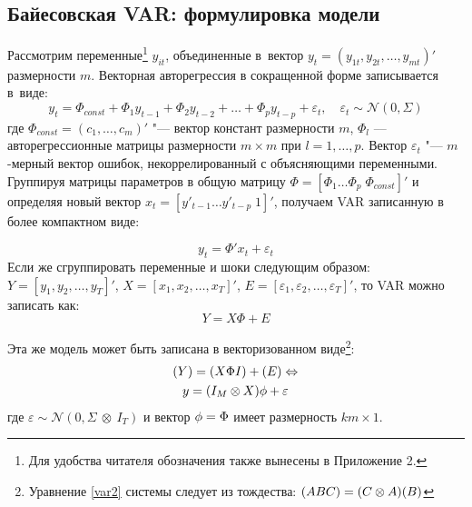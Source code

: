 \documentclass[11pt]{article} %
\DeclareMathOperator{\E}{\mathbb{E}}
\newcommand{\cN}{\mathcal{N}}
\let\vec\relax
\DeclareMathOperator{\vec}{vec}
\begin{document}
\subsection{Байесовская VAR: формулировка модели}
Рассмотрим переменные\footnote{Для удобства читателя обозначения также вынесены в Приложение 2.} $y_{it}$, объединенные в~вектор  $y_{t}=(y_{1t},y_{2t},\ldots, y_{mt})'$ размерности $m$. Векторная авторегрессия в сокращенной форме записывается в~виде:
\begin{equation}
y_t =\Phi_{const}+ \Phi_1 y_{t-1} + \Phi_2 y_{t-2} +\ldots + \Phi_p y_{t-p} + \varepsilon_t,\quad \varepsilon_t\sim \cN(0,\Sigma)
\end{equation}
где $\Phi_{const}=(c_1,\ldots ,c_m)'$ "--- вектор констант размерности $m$, $\Phi_l$ --– авторегрессионные матрицы размерности $m\times m$ при $l=1, \ldots, p$. Вектор $\varepsilon_t$ "--- $m$-мерный вектор ошибок, %
некоррелированный с объясняющими переменными.
Группируя матрицы параметров в общую матрицу $\Phi=[\Phi_1 \ldots \Phi_p \; \Phi_{const}]'$ %
и определяя новый вектор $x_t=[ y'_{t-1} \ldots  y'_{t-p} \; 1]'$, получаем VAR записанную в более компактном виде:

\begin{equation}
y_t=\Phi' x_t+\varepsilon_t
\end{equation}
Если же сгруппировать переменные  и шоки следующим образом: $Y=[y_1, y_2,\ldots, y_T]'$, $X=[x_1, x_2,\ldots, x_T]'$, $E=[\varepsilon_1, \varepsilon_2,\ldots, \varepsilon_T]'$, то VAR можно записать как:
\begin{equation}
Y=X\Phi+E\label{var}
\end{equation}

Эта же модель может быть записана в векторизованном виде\footnote{Уравнение \ref{var2} системы следует из тождества: $\vec(ABC)=(C\otimes A)\vec (B)$}:
\begin{gather}
\vec(Y)=\vec(X\Phi I)+\vec(E)\Leftrightarrow \\
y=(I_M\otimes X)\phi + \varepsilon \label{var2}
\end{gather}
где $\varepsilon  \sim \cN(0,\Sigma\ \otimes\ I_T)$ и вектор $\phi=\vec{\Phi}$ имеет размерность $km\times 1$.
\end{document}

